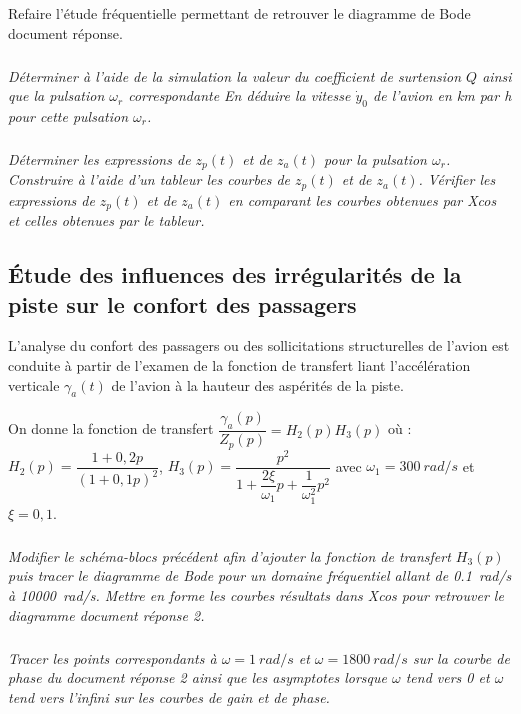\documentclass[10pt,fleqn]{article} %
\begin{document}
\begin{multicols}{2}
Refaire l'étude fréquentielle permettant de retrouver le diagramme de Bode document réponse.


\subparagraph{}
\textit{Déterminer à l'aide de la simulation la valeur du coefficient de surtension $Q$ ainsi que la pulsation  $\omega_r$ correspondante En déduire la vitesse $\dot{y}_0$ de l'avion en km par h pour cette pulsation $\omega_r$.}
\ifprof
\begin{corrige}
\end{corrige}
\else
\fi


\subparagraph{}
\textit{Déterminer les expressions de $z_p(t)$ et de $z_a(t)$ pour la pulsation $\omega_r$. Construire à l’aide d’un tableur les
courbes de $z_p(t)$ et de $z_a(t)$. Vérifier les expressions de $z_p(t)$ et de $z_a(t)$ en comparant les courbes obtenues par Xcos et celles obtenues par le tableur.}
\ifprof
\begin{corrige}
\end{corrige}
\else
\fi

\subsection*{Étude des influences des irrégularités de la piste sur le confort des passagers}


L'analyse du confort des passagers ou des sollicitations structurelles de l'avion 
est conduite à partir de l'examen 
de la fonction de transfert liant 
l'accélération verticale $\gamma_a(t)$
de l'avion à la hauteur des aspérités de la piste.


On donne la fonction de transfert $\dfrac{\gamma_a(p)}{Z_p(p)}=H_2(p) H_3(p)$ où : $H_2(p)=\dfrac{1+0,2 p}{\left(1+0,1 p \right)^2}$, $H_3(p)=\dfrac{p^2}{1+\dfrac{2\xi}{\omega_1}p+\dfrac{1}{\omega_1^2}p^2}$ avec $\omega_1=\SI{300}{rad/s}$ et $\xi=0,1$. 



\subparagraph{}
\textit{Modifier le schéma-blocs
précédent afin d’ajouter la fonction de transfert $H_3(p)$ puis tracer le diagramme
de Bode pour un domaine fréquentiel allant de \SI{0,1}{rad/s} à \SI{10000}{rad/s}. Mettre en forme les courbes résultats
dans Xcos pour retrouver le diagramme document réponse 2.}
\ifprof
\begin{corrige}
\end{corrige}
\else
\fi


\subparagraph{}
\textit{Tracer les points correspondants à $\omega=\SI{1}{rad/s}$ et $\omega=\SI{1800}{rad/s}$ sur la courbe de phase du document réponse 2 ainsi que les asymptotes lorsque $\omega$ tend vers 0 et $\omega$ tend vers l'infini sur les courbes de gain et de phase.}
\ifprof
\begin{corrige}
\end{corrige}
\else
\fi



\end{multicols}
\end{document}
